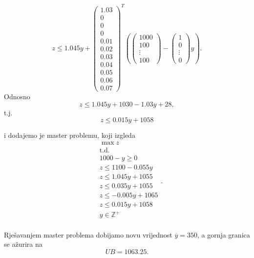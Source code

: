 \documentclass[b5paper, utf8, 11pt, colorlinks]{book}
\theoremstyle{definition}
\begin{document}
 
 $$z\leqslant 1.045y+\left(\begin{array}{c}
 	1.03 \\
 	0 \\
 	0\\
 	0\\
 	0.01\\
 	0.02\\
 	0.03\\
 	0.04\\
 	0.05\\
 	0.06\\
 	0.07
 \end{array}\right)^T
 \left(\left(\begin{array}{c}
 	1000 \\
 	100 \\
 	\vdots \\
 	100
 \end{array}\right)-\left(\begin{array}{c}
 	1 \\
 	0 \\
 	\vdots \\
 	0
 \end{array}\right)y\right).$$
 Odnosno 
 $$z\leqslant 1.045y+1030-1.03y+28,$$
 t.j.
 $$z\leqslant 0.015y+1058$$
 
 i dodajemo je master problemu, koji izgleda
  $$
 \begin{aligned}
 	&\max z\\
 	&\mbox{t.d.}\\
 	&1000-y\geqslant 0\\
 	&z\leqslant 1100-0.055y\\ 
 	&z\leqslant 1.045y+1055\\
 	&z\leqslant 0.035y+1055\\
 	&z\leqslant -0.005y+1065\\
 	&z\leqslant 0.015y+1058\\
 	&y\in\mathbb{Z}^+\\	
 \end{aligned}
 .$$
 
 Rješavanjem master problema dobijamo novu vrijednost $\overline{y} =350$, a gornja granica se ažurira na 
 $$UB = 1063.25.$$
 
\end{document}
